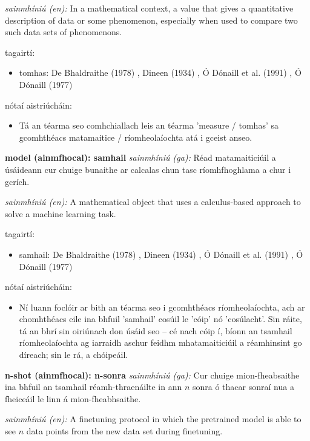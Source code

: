 \documentclass{article}
\begin{document}
\textit{sainmhíniú (en):} In a mathematical context, a value that gives a quantitative description of data or some phenomenon, especially when used to compare two such data sets of phenomenons.

tagairtí:
\begin{itemize}
	\item tomhas: De Bhaldraithe (1978) \cite{de-bhaldraithe}, Dineen (1934) \cite{dineen}, Ó Dónaill et al. (1991) \cite{focloir-beag}, Ó Dónaill (1977) \cite{odonaill}
\end{itemize}

nótaí aistriúcháin:
\begin{itemize}
	\item Tá an téarma seo comhchiallach leis an téarma 'measure / tomhas' sa gcomhthéacs matamaitice / ríomheolaíochta atá i gceist anseo.
\end{itemize}


\textbf{model (ainmfhocal): samhail}
\textit{sainmhíniú (ga):} Réad matamaiticiúil a úsáideann cur chuige bunaithe ar calcalas chun tasc ríomhfhoghlama a chur i gcrích.

\textit{sainmhíniú (en):} A mathematical object that uses a calculus-based approach to solve a machine learning task.

tagairtí:
\begin{itemize}
	\item samhail: De Bhaldraithe (1978) \cite{de-bhaldraithe}, Dineen (1934) \cite{dineen}, Ó Dónaill et al. (1991) \cite{focloir-beag}, Ó Dónaill (1977) \cite{odonaill}
\end{itemize}

nótaí aistriúcháin:
\begin{itemize}
	\item Ní luann foclóir ar bith an téarma seo i gcomhthéacs ríomheolaíochta, ach ar chomhthéacs eile ina bhfuil 'samhail' cosúil le 'cóip' nó 'cosúlacht'. Sin ráite, tá an bhrí sin oiriúnach don úsáid seo -- cé nach cóip í, bíonn an tsamhail ríomheolaíochta ag iarraidh aschur feidhm mhatamaiticiúil a réamhinsint go díreach; sin le rá, a chóipeáil.
\end{itemize}


\textbf{n-shot (ainmfhocal): n-sonra}
\textit{sainmhíniú (ga):} Cur chuige mion-fheabsaithe ina bhfuil an tsamhail réamh-thraenáilte in ann $n$ sonra ó thacar sonraí nua a fheiceáil le linn á mion-fheabhsaithe.

\textit{sainmhíniú (en):} A finetuning protocol in which the pretrained model is able to see $n$ data points from the new data set during finetuning.
\end{document}
